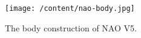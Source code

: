 \begin{figure}
	\centering
	\texttt{[image: /content/nao-body.jpg]} 
	\caption{The body construction of NAO V5. \cite{8}} \label{fg:nao:body} 
\end{figure}
